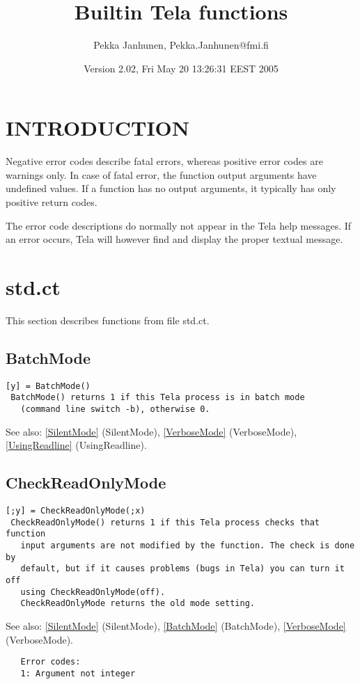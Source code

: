 \documentclass[a4paper]{article}
\title{Builtin Tela functions}
\author{Pekka Janhunen, {\ttfamily Pekka.Janhunen@fmi.fi}}
\date{Version 2.02, Fri May 20 13:26:31 EEST 2005}
\begin{document}
\maketitle
\tableofcontents

\section{INTRODUCTION}

Negative error codes describe fatal errors, whereas positive error
codes are warnings only. In case of fatal error, the function
output arguments have undefined values. If a function has no output
arguments, it typically has only positive return codes.

The error code descriptions do normally not appear in the Tela
help messages. If an error occurs, Tela will however find and
display the proper textual message.




\section{std.ct}

This section describes functions from file std.ct.




\subsection{BatchMode\label{BatchMode}}

\begin{tscreen}
\begin{verbatim}
[y] = BatchMode()
 BatchMode() returns 1 if this Tela process is in batch mode
   (command line switch -b), otherwise 0.
\end{verbatim}

See also: \ref{SilentMode} {(SilentMode)}, \ref{VerboseMode} {(VerboseMode)}, \ref{UsingReadline} {(UsingReadline)}.
\end{tscreen}



\subsection{CheckReadOnlyMode\label{CheckReadOnlyMode}}

\begin{tscreen}
\begin{verbatim}
[;y] = CheckReadOnlyMode(;x)
 CheckReadOnlyMode() returns 1 if this Tela process checks that function
   input arguments are not modified by the function. The check is done by
   default, but if it causes problems (bugs in Tela) you can turn it off
   using CheckReadOnlyMode(off).
   CheckReadOnlyMode returns the old mode setting.
\end{verbatim}

See also: \ref{SilentMode} {(SilentMode)}, \ref{BatchMode} {(BatchMode)}, \ref{VerboseMode} {(VerboseMode)}.
\begin{verbatim}
   Error codes:
   1: Argument not integer 
\end{verbatim}
\end{tscreen}
\end{document}
